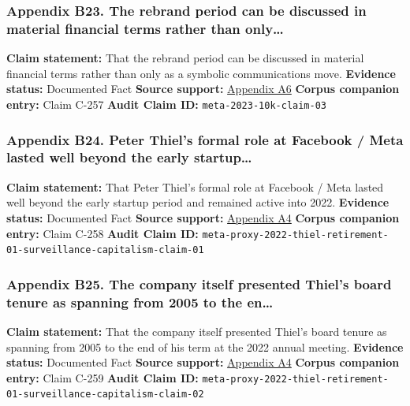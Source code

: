\documentclass[
  american,
  11pt,
  letterpaper,
]{article}
\begin{document}
\subsubsection{Appendix B23. The rebrand period can be discussed in
material financial terms rather than
only\ldots{}}\label{appendix-b23-the-rebrand-period-can-be-discussed-in-material-financial-terms-rather-than-only}

\textbf{Claim statement:} That the rebrand period can be discussed in
material financial terms rather than only as a symbolic communications
move. \textbf{Evidence status:} Documented Fact \textbf{Source support:}
\hyperref[appendix-a6-meta-platforms-inc-2023-annual-report-form-10-k]{Appendix
A6} \textbf{Corpus companion entry:} Claim C-257 \textbf{Audit Claim
ID:} \texttt{meta-2023-10k-claim-03}

\subsubsection{Appendix B24. Peter Thiel's formal role at Facebook /
Meta lasted well beyond the early
startup\ldots{}}\label{appendix-b24-peter-thiel-s-formal-role-at-facebook-meta-lasted-well-beyond-the-early-startup}

\textbf{Claim statement:} That Peter Thiel's formal role at Facebook /
Meta lasted well beyond the early startup period and remained active
into 2022. \textbf{Evidence status:} Documented Fact \textbf{Source
support:}
\hyperref[appendix-a4-meta-platforms-inc-2022-definitive-proxy-statement]{Appendix
A4} \textbf{Corpus companion entry:} Claim C-258 \textbf{Audit Claim
ID:}
\texttt{meta-proxy-2022-thiel-retirement-01-surveillance-capitalism-claim-01}

\subsubsection{Appendix B25. The company itself presented Thiel's board
tenure as spanning from 2005 to the
en\ldots{}}\label{appendix-b25-the-company-itself-presented-thiel-s-board-tenure-as-spanning-from-2005-to-the-en}

\textbf{Claim statement:} That the company itself presented Thiel's
board tenure as spanning from 2005 to the end of his term at the 2022
annual meeting. \textbf{Evidence status:} Documented Fact \textbf{Source
support:}
\hyperref[appendix-a4-meta-platforms-inc-2022-definitive-proxy-statement]{Appendix
A4} \textbf{Corpus companion entry:} Claim C-259 \textbf{Audit Claim
ID:}
\texttt{meta-proxy-2022-thiel-retirement-01-surveillance-capitalism-claim-02}
\end{document}
